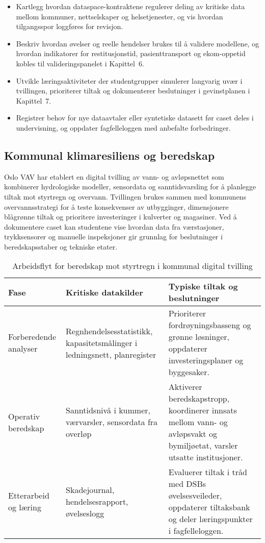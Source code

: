 \begin{itemize}
    \item Kartlegg hvordan dataspace-kontraktene regulerer deling av kritiske data mellom kommuner, nettselskaper og helsetjenester, og vis hvordan tilgangsspor loggføres for revisjon.\citep{dsb2023beredskapsplikt}
    \item Beskriv hvordan øvelser og reelle hendelser brukes til å validere modellene, og hvordan indikatorer for restitusjonstid, pasienttransport og ekom-oppetid kobles til valideringspanelet i Kapittel~6.\citep{helsenord2023beredskap}
    \item Utvikle læringsaktiviteter der studentgrupper simulerer langvarig uvær i tvillingen, prioriterer tiltak og dokumenterer beslutninger i gevinstplanen i Kapittel~7.\citep{nve2023lokalenergi}
    \item Registrer behov for nye dataavtaler eller syntetiske datasett før caset deles i undervisning, og oppdater fagfelleloggen med anbefalte forbedringer.\citep{nkom2023robustekommunikasjon}
\end{itemize}

\subsection*{Kommunal klimaresiliens og beredskap}
Oslo VAV har etablert en digital tvilling av vann- og avløpsnettet som kombinerer hydrologiske modeller, sensordata og sanntidsvarsling for å planlegge tiltak mot styrtregn og overvann.\citep{oslovav2023digital} Tvillingen brukes sammen med kommunens overvannsstrategi for å teste konsekvenser av utbygginger, dimensjonere blågrønne tiltak og prioritere investeringer i kulverter og magasiner.\citep{oslo2023overvann} Ved å dokumentere caset kan studentene vise hvordan data fra værstasjoner, trykksensorer og manuelle inspeksjoner gir grunnlag for beslutninger i beredskapsstaber og tekniske etater.

\begin{table}[h]
    \centering
    \caption{Arbeidsflyt for beredskap mot styrtregn i kommunal digital tvilling}
    \label{tab:kommunal-beredskap}
    \begin{tabular}{p{3.4cm}p{4.5cm}p{5.0cm}}
        \toprule
        Fase & Kritiske datakilder & Typiske tiltak og beslutninger \\
        \midrule
        Forberedende analyser & Regnhendelsesstatistikk, kapasitetsmålinger i ledningsnett, planregister & Prioriterer fordrøyningsbasseng og grønne løsninger, oppdaterer investeringsplaner og byggesaker. \\
        Operativ beredskap & Sanntidsnivå i kummer, værvarsler, sensordata fra overløp & Aktiverer beredskapstropp, koordinerer innsats mellom vann- og avløpsvakt og bymiljøetat, varsler utsatte institusjoner. \\
        Etterarbeid og læring & Skadejournal, hendelsesrapport, øvelseslogg & Evaluerer tiltak i tråd med DSBs øvelsesveileder, oppdaterer tiltaksbank og deler læringspunkter i fagfelleloggen.\citep{dsb2024nser,dsb2023ovelser} \\
        \bottomrule
    \end{tabular}
\end{table}

